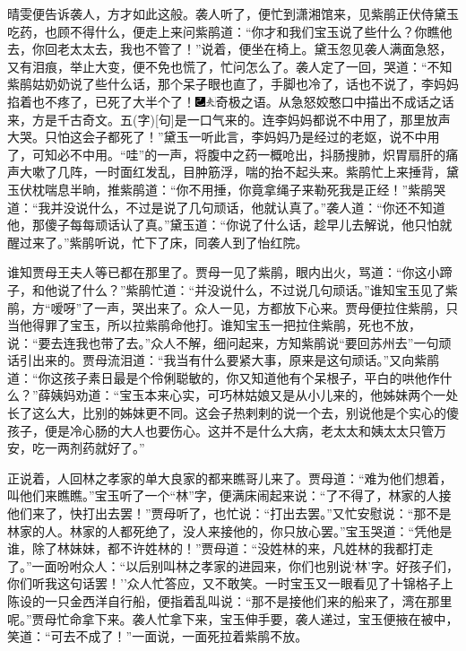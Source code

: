 晴雯便告诉袭人，方才如此这般。袭人听了，便忙到潇湘馆来，见紫鹃正伏侍黛玉吃药，也顾不得什么，便走上来问紫鹃道：``你才和我们宝玉说了些什么？你瞧他去，你回老太太去，我也不管了！''说着，便坐在椅上。黛玉忽见袭人满面急怒，又有泪痕，举止大变，便不免也慌了，忙问怎么了。袭人定了一回，哭道：``不知紫鹃姑奶奶说了些什么话，那个呆子眼也直了，手脚也冷了，话也不说了，李妈妈掐着也不疼了，已死了大半个了！{\includegraphics[width=3mm]{../Images/00003}\includegraphics[width=3mm]{../Images/00012}\footnotesize \kaishu 奇极之语。从急怒姣憨口中描出不成话之话来，方是千古奇文。五{(字)}{[}句{]}是一口气来的。}连李妈妈都说不中用了，那里放声大哭。只怕这会子都死了！''黛玉一听此言，李妈妈乃是经过的老妪，说不中用了，可知必不中用。``哇''的一声，将腹中之药一概呛出，抖肠搜肺，炽胃扇肝的痛声大嗽了几阵，一时面红发乱，目肿筋浮，喘的抬不起头来。紫鹃忙上来捶背，黛玉伏枕喘息半晌，推紫鹃道：``你不用捶，你竟拿绳子来勒死我是正经！''紫鹃哭道：``我并没说什么，不过是说了几句顽话，他就认真了。''袭人道：``你还不知道他，那傻子每每顽话认了真。''黛玉道：``你说了什么话，趁早儿去解说，他只怕就醒过来了。''紫鹃听说，忙下了床，同袭人到了怡红院。

谁知贾母王夫人等已都在那里了。贾母一见了紫鹃，眼内出火，骂道：``你这小蹄子，和他说了什么？''紫鹃忙道：``并没说什么，不过说几句顽话。''谁知宝玉见了紫鹃，方``嗳呀''了一声，哭出来了。众人一见，方都放下心来。贾母便拉住紫鹃，只当他得罪了宝玉，所以拉紫鹃命他打。谁知宝玉一把拉住紫鹃，死也不放，说：``要去连我也带了去。''众人不解，细问起来，方知紫鹃说``要回苏州去''一句顽话引出来的。贾母流泪道：``我当有什么要紧大事，原来是这句顽话。''又向紫鹃道：``你这孩子素日最是个伶俐聪敏的，你又知道他有个呆根子，平白的哄他作什么？''薛姨妈劝道：``宝玉本来心实，可巧林姑娘又是从小儿来的，他姊妹两个一处长了这么大，比别的姊妹更不同。这会子热剌剌的说一个去，别说他是个实心的傻孩子，便是冷心肠的大人也要伤心。这并不是什么大病，老太太和姨太太只管万安，吃一两剂药就好了。''

正说着，人回林之孝家的单大良家的都来瞧哥儿来了。贾母道：``难为他们想着，叫他们来瞧瞧。''宝玉听了一个``林''字，便满床闹起来说：``了不得了，林家的人接他们来了，快打出去罢！''贾母听了，也忙说：``打出去罢。''又忙安慰说：``那不是林家的人。林家的人都死绝了，没人来接他的，你只放心罢。''宝玉哭道：``凭他是谁，除了林妹妹，都不许姓林的！''贾母道：``没姓林的来，凡姓林的我都打走了。''一面吩咐众人：``以后别叫林之孝家的进园来，你们也别说`林'字。好孩子们，你们听我这句话罢！''众人忙答应，又不敢笑。一时宝玉又一眼看见了十锦格子上陈设的一只金西洋自行船，便指着乱叫说：``那不是接他们来的船来了，湾在那里呢。''贾母忙命拿下来。袭人忙拿下来，宝玉伸手要，袭人递过，宝玉便掖在被中，笑道：``可去不成了！''一面说，一面死拉着紫鹃不放。


